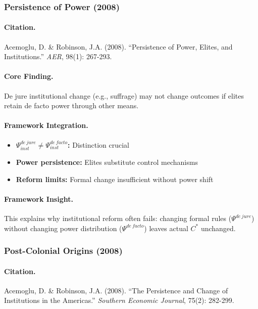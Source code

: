 \subsubsection{Persistence of Power (2008)}

\paragraph{Citation.}
Acemoglu, D. \& Robinson, J.A. (2008).
``Persistence of Power, Elites, and Institutions.'' \emph{AER}, 98(1): 267-293.

\paragraph{Core Finding.}
De jure institutional change (e.g., suffrage) may not change outcomes
if elites retain de facto power through other means.

\paragraph{Framework Integration.}
\begin{itemize}
  \item \textbf{$\Psi_{inst}^{de\ jure} \neq \Psi_{inst}^{de\ facto}$:} Distinction crucial
  \item \textbf{Power persistence:} Elites substitute control mechanisms
  \item \textbf{Reform limits:} Formal change insufficient without power shift
\end{itemize}

\paragraph{Framework Insight.}
This explains why institutional reform often fails: changing formal rules
($\Psi^{de\ jure}$) without changing power distribution ($\Psi^{de\ facto}$)
leaves actual $C^*$ unchanged.

\subsubsection{Post-Colonial Origins (2008)}

\paragraph{Citation.}
Acemoglu, D. \& Robinson, J.A. (2008).
``The Persistence and Change of Institutions in the Americas.''
\emph{Southern Economic Journal}, 75(2): 282-299.

